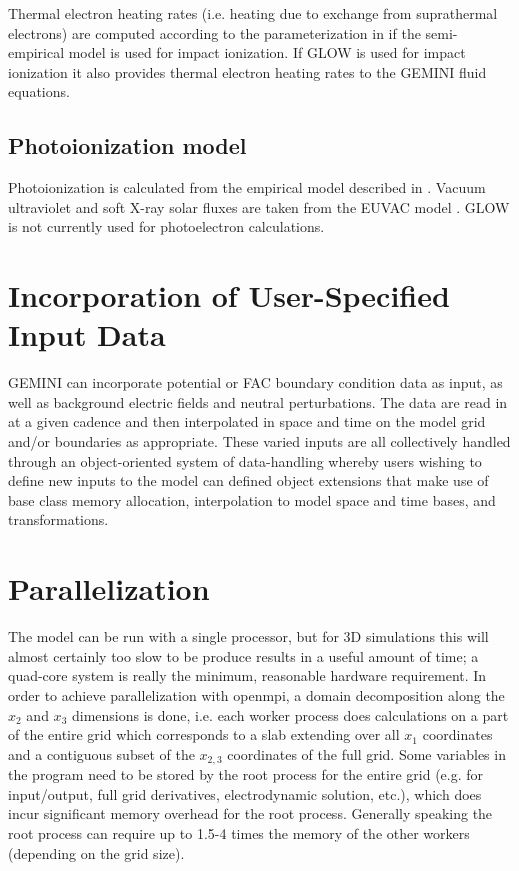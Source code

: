 \documentclass[11pt,letterpaper]{article}
\begin{document}
Thermal electron heating rates (i.e. heating due to exchange from suprathermal electrons) are computed according to the parameterization in \citet{Swartz:1972} if the \citet{Fang:2008} semi-empirical model is used for impact ionization.  If GLOW is used for impact ionization it also provides thermal electron heating rates to the GEMINI fluid equations.  


\subsection{Photoionization model}

Photoionization is calculated from the empirical model described in \citet{Solomon:2005}.  Vacuum ultraviolet and soft X-ray solar fluxes are taken from the EUVAC model \citep{Richards:1994}.  GLOW is not currently used for photoelectron calculations.  


\section{Incorporation of User-Specified Input Data}

GEMINI can incorporate potential or FAC boundary condition data as input, as well as background electric fields and neutral perturbations.  The data are read in at a given cadence and then interpolated in space and time on the model grid and/or boundaries as appropriate.  These varied inputs are all collectively handled through an object-oriented system of data-handling whereby users wishing to define new inputs to the model can defined object extensions that make use of base class memory allocation, interpolation to model space and time bases, and transformations.   


\section{Parallelization}

The model can be run with a single processor, but for 3D simulations this will almost certainly too slow to be produce results in a useful amount of time; a quad-core system is really the minimum, reasonable hardware requirement.  In order to achieve parallelization with openmpi, a domain decomposition along the $x_2$ and $x_3$ dimensions is done, i.e. each worker process does calculations on a part of the entire grid which corresponds to a slab extending over all $x_1$ coordinates and a contiguous subset of the $x_{2,3}$ coordinates of the full grid.  Some variables in the program need to be stored by the root process for the entire grid (e.g. for input/output, full grid derivatives, electrodynamic solution, etc.), which does incur significant memory overhead for the root process.  Generally speaking the root process can require up to 1.5-4 times the memory of the other workers (depending on the grid size).
\end{document}
